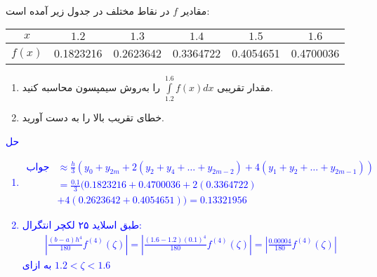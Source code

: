 \\
مقادیر
$f$
در نقاط مختلف در جدول زیر آمده است:

\begin{latin}
\begin{table}[H]
  \begin{center}
    \begin{tabular}{c|c c c c c}
      \textbf{$x$} & $1.2$ & $1.3$ & $1.4$ & $1.5$ & $1.6$ \\
      \hline
      \textbf{$f(x)$} & 0.1823216 & 0.2623642 & 0.3364722 & 0.4054651 & 0.4700036 \\
    \end{tabular}
  \end{center}
\end{table}
\end{latin}

\begin{enumerate}
	\item
    مقدار تقریبی
    $\int\limits^{1.6}_{1.2}f(x)dx$
    را به‌روش سیمپسون محاسبه کنید.
    
    \item
    خطای تقریب بالا را به دست آورید.
\end{enumerate}
\textcolor{blue}{حل
\\
\begin{enumerate}
    \item
    \begin{align*}
        \text{جواب} &\approx \frac{h}{3} (y_0 + y_{2m} + 2(y_2 + y_4 + \dots + y_{2m - 2}) + 4(y_1 + y_2 + \dots + y_{2m - 1})) \\
        &= \frac{0.1}{3} (0.1823216 + 0.4700036 + 2 (0.3364722) \\
        &+ 4(0.2623642+0.4054651)) = 0.13321956 
    \end{align*}
    \item 
    طبق اسلاید ۲۵ لکچر انتگرال:
    \begin{align*}
        |\frac{(b-a)h^4}{180} f^{(4)} (\zeta)| = |\frac{(1.6 - 1.2)(0.1)^4}{180} f^{(4)}(\zeta)| = |\frac{0.00004}{180} f^{(4)}(\zeta)|
    \end{align*}
    به ازای
    $1.2 < \zeta < 1.6$
\end{enumerate}
}